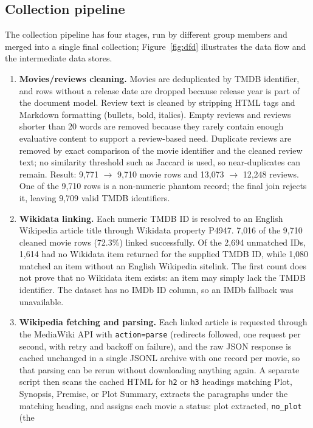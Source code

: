 \documentclass[sigconf]{acmart}
\begin{document}
\subsection{Collection pipeline}
The collection pipeline has four stages, run by different group members and merged
into a single final collection; Figure~\ref{fig:dfd} illustrates the data flow and the
intermediate data stores.
\begin{enumerate}
  \item \textbf{Movies/reviews cleaning.} Movies are deduplicated by TMDB identifier,
    and rows without a release date are dropped because release year is part of the
    document model. Review text is cleaned by stripping HTML tags and Markdown
    formatting (bullets, bold, italics). Empty reviews and reviews shorter than 20
    words are removed because they rarely contain enough evaluative content to support
    a review-based need. Duplicate reviews are removed by exact comparison of the movie
    identifier and the cleaned review text; no similarity threshold such as Jaccard is
    used, so near-duplicates can remain. Result: 9{,}771 $\rightarrow$ 9{,}710 movie
    rows and 13{,}073 $\rightarrow$ 12{,}248 reviews. One of the 9{,}710 rows is a
    non-numeric phantom record; the final join rejects it, leaving 9{,}709 valid TMDB
    identifiers.
  \item \textbf{Wikidata linking.} Each numeric TMDB ID is resolved to an English
    Wikipedia article title through Wikidata property P4947. 7{,}016 of the 9{,}710
    cleaned movie rows (72.3\%) linked successfully. Of the 2{,}694 unmatched IDs,
    1{,}614 had no Wikidata item returned for the supplied TMDB ID, while 1{,}080
    matched an item without an English Wikipedia sitelink. The first count does not
    prove that no Wikidata item exists: an item may simply lack the TMDB identifier.
    The dataset has no IMDb ID column, so an IMDb fallback was unavailable.
  \item \textbf{Wikipedia fetching and parsing.} Each linked article is requested
    through the MediaWiki API with \texttt{action=parse} (redirects followed, one
    request per second, with retry and backoff on failure), and the raw JSON response
    is cached unchanged in a single JSONL archive with one record per movie, so that
    parsing can be rerun without downloading anything again. A separate script then
    scans the cached HTML for \texttt{h2} or \texttt{h3} headings matching Plot,
    Synopsis, Premise, or Plot Summary, extracts the paragraphs under the matching
    heading, and assigns each movie a status: plot extracted, \texttt{no\_plot} (the

\end{enumerate}
\end{document}
